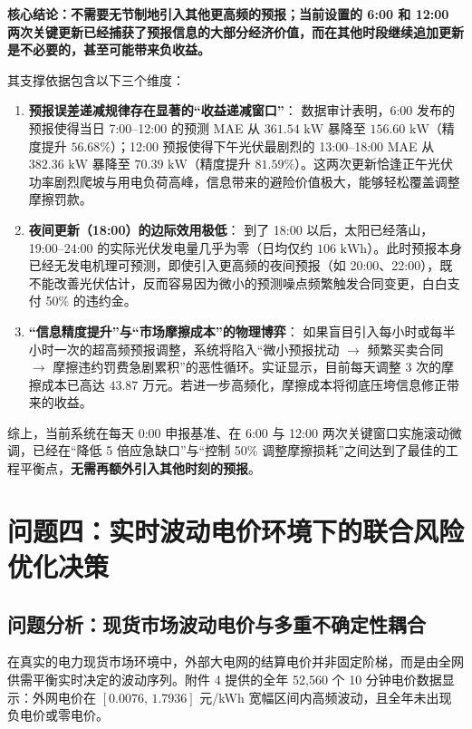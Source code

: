 \documentclass[withoutpreface]{cumcmthesis}
\begin{document}
\noindent\textbf{核心结论：不需要无节制地引入其他更高频的预报；当前设置的 6:00 和 12:00 两次关键更新已经捕获了预报信息的大部分经济价值，而在其他时段继续追加更新是不必要的，甚至可能带来负收益。}

其支撑依据包含以下三个维度：
\begin{enumerate}
    \item \textbf{预报误差递减规律存在显著的“收益递减窗口”}：
    数据审计表明，6:00 发布的预报使得当日 7:00--12:00 的预测 MAE 从 $361.54\text{ kW}$ 暴降至 $156.60\text{ kW}$（精度提升 $56.68\%$）；12:00 预报使得下午光伏最剧烈的 13:00--18:00 MAE 从 $382.36\text{ kW}$ 暴降至 $70.39\text{ kW}$（精度提升 $81.59\%$）。这两次更新恰逢正午光伏功率剧烈爬坡与用电负荷高峰，信息带来的避险价值极大，能够轻松覆盖调整摩擦罚款。
    
    \item \textbf{夜间更新（18:00）的边际效用极低}：
    到了 18:00 以后，太阳已经落山，19:00--24:00 的实际光伏发电量几乎为零（日均仅约 $106\text{ kWh}$）。此时预报本身已经无发电机理可预测，即使引入更高频的夜间预报（如 20:00、22:00），既不能改善光伏估计，反而容易因为微小的预测噪点频繁触发合同变更，白白支付 50\% 的违约金。
    
    \item \textbf{“信息精度提升”与“市场摩擦成本”的物理博弈}：
    如果盲目引入每小时或每半小时一次的超高频预报调整，系统将陷入“微小预报扰动 $\to$ 频繁买卖合同 $\to$ 摩擦违约罚费急剧累积”的恶性循环。实证显示，目前每天调整 3 次的摩擦成本已高达 $43.87\text{ 万元}$。若进一步高频化，摩擦成本将彻底压垮信息修正带来的收益。
\end{enumerate}
综上，当前系统在每天 0:00 申报基准、在 6:00 与 12:00 两次关键窗口实施滚动微调，已经在“降低 5 倍应急缺口”与“控制 50\% 调整摩擦损耗”之间达到了最佳的工程平衡点，\textbf{无需再额外引入其他时刻的预报}。
\section{问题四：实时波动电价环境下的联合风险优化决策}

\subsection{问题分析：现货市场波动电价与多重不确定性耦合}
在真实的电力现货市场环境中，外部大电网的结算电价并非固定阶梯，而是由全网供需平衡实时决定的波动序列。附件 4 提供的全年 52,560 个 10 分钟电价数据显示：外网电价在 $[0.0076,\, 1.7936]$ 元/kWh 宽幅区间内高频波动，且全年未出现负电价或零电价。
\end{document}
